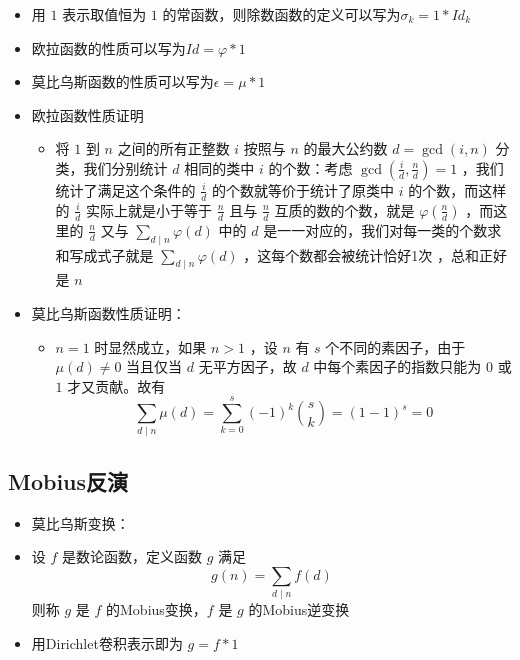 \documentclass{beamer}
\begin{document}
\begin{frame}
\begin{itemize}[<+-| alert@+>]
	\item 用 $1$ 表示取值恒为 $1$ 的常函数，则除数函数的定义可以写为$\sigma_{k}=1*Id_{k}$
	\item 欧拉函数的性质可以写为$Id=\varphi * 1$
	\item 莫比乌斯函数的性质可以写为$\epsilon=\mu * 1$
\end{itemize}
\end{frame}

\begin{frame}
\begin{itemize}[<+-| alert@+>]
	\item 欧拉函数性质证明
		\begin{itemize}[<+-| alert@+>]
			\item 将 $1$ 到 $n$ 之间的所有正整数 $i$ 按照与 $n$ 的最大公约数 $d=\gcd(i,n)$ 分类，我们分别统计 $d$ 相同的类中 $i$ 的个数：考虑 $\gcd(\frac{i}{d},\frac{n}{d})=1$ ，我们统计了满足这个条件的 $\frac{i}{d}$ 的个数就等价于统计了原类中 $i$ 的个数，而这样的 $\frac{i}{d}$ 实际上就是小于等于 $\frac{n}{d}$ 且与 $\frac{n}{d}$ 互质的数的个数，就是 $\varphi(\frac{n}{d})$ ，而这里的 $\frac{n}{d}$ 又与 $\sum_{d\mid n}\varphi(d)$ 中的 $d$ 是一一对应的，我们对每一类的个数求和写成式子就是 $\sum_{d\mid n}\varphi(d)$ ，这每个数都会被统计恰好1次 ，总和正好是 $n$ 
		\end{itemize}
	\item 莫比乌斯函数性质证明：
		\begin{itemize}[<+-| alert@+>]
			\item $n=1$ 时显然成立，如果 $n>1$ ，设 $n$ 有 $s$ 个不同的素因子，由于 $\mu(d)\neq 0$ 当且仅当 $d$ 无平方因子，故 $d$ 中每个素因子的指数只能为 $0$ 或 $1$ 才又贡献。故有$$\sum_{d\mid n} \mu(d)=\sum_{k=0}^{s}(-1)^{k}\binom{s}{k}=(1-1)^{s}=0$$
		\end{itemize}
\end{itemize}
\end{frame}

\subsection{Mobius反演}

\begin{frame}
\begin{itemize}[<+-| alert@+>]
	\item 莫比乌斯变换：
	\item 设 $f$ 是数论函数，定义函数 $g$ 满足$$g(n)=\sum_{d\mid n}f(d)$$
		则称 $g$ 是 $f$ 的Mobius变换，$f$ 是 $g$ 的Mobius逆变换
	\item 用Dirichlet卷积表示即为 $g=f*1$
\end{itemize}
\end{frame}
\end{document}
